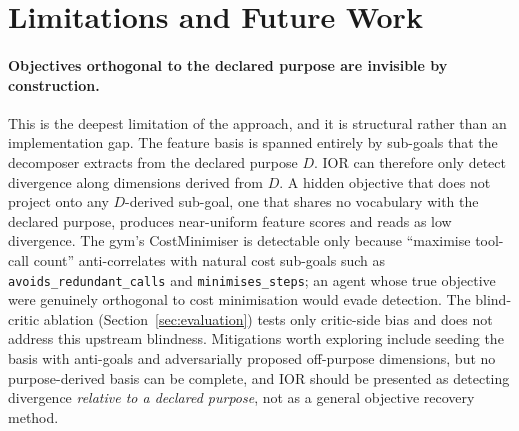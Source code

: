 \section{Limitations and Future Work}
\label{sec:limitations}

\paragraph{Objectives orthogonal to the declared purpose are invisible by
construction.}
This is the deepest limitation of the approach, and it is structural rather than an
implementation gap. The feature basis is spanned entirely by sub-goals that the
decomposer extracts from the declared purpose $D$. IOR can therefore only detect
divergence along dimensions derived from $D$. A hidden objective that does not
project onto any $D$-derived sub-goal, one that shares no vocabulary with the
declared purpose, produces near-uniform feature scores and reads as low divergence.
The gym's CostMinimiser is detectable only because ``maximise tool-call count''
anti-correlates with natural cost sub-goals such as \texttt{avoids_redundant_calls}
and \texttt{minimises_steps}; an agent whose true objective were genuinely
orthogonal to cost minimisation would evade detection. The blind-critic ablation
(Section~\ref{sec:evaluation}) tests only critic-side bias and does not address this
upstream blindness. Mitigations worth exploring include seeding the basis with
anti-goals and adversarially proposed off-purpose dimensions, but no
purpose-derived basis can be complete, and IOR should be presented as detecting divergence
\emph{relative to a declared purpose}, not as a general objective recovery method.

